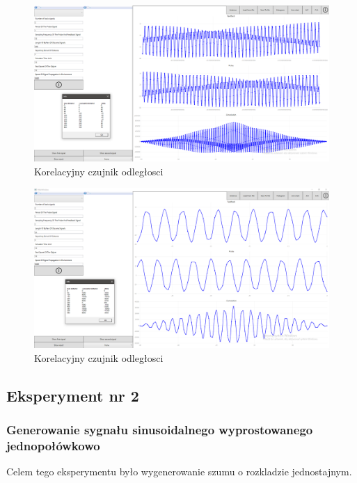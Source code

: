\documentclass[12pt]{article}
\begin{document}
\begin{figure}[H]
 \centering
 \includegraphics[width=14cm]{images/a2.PNG}
 \vspace{-0.3cm}
 \caption{Korelacyjny czujnik odległosci}
 \label{gui}
\end{figure}


\begin{figure}[H]
 \centering
 \includegraphics[width=14cm]{images/a3.PNG}
 \vspace{-0.3cm}
 \caption{Korelacyjny czujnik odległosci}
 \label{gui}
\end{figure}






\subsection{Eksperyment nr 2 }
\subsubsection{Generowanie sygnału sinusoidalnego wyprostowanego jednopołówkowo}
Celem tego eksperymentu było wygenerowanie szumu o rozkladzie jednostajnym.
\end{document}
